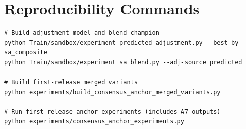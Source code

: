 \documentclass[11pt]{article}
\begin{document}
\section{Reproducibility Commands}
\begin{verbatim}
# Build adjustment model and blend champion
python Train/sandbox/experiment_predicted_adjustment.py --best-by sa_composite
python Train/sandbox/experiment_sa_blend.py --adj-source predicted

# Build first-release merged variants
python experiments/build_consensus_anchor_merged_variants.py

# Run first-release anchor experiments (includes A7 outputs)
python experiments/consensus_anchor_experiments.py
\end{verbatim}
\end{document}

